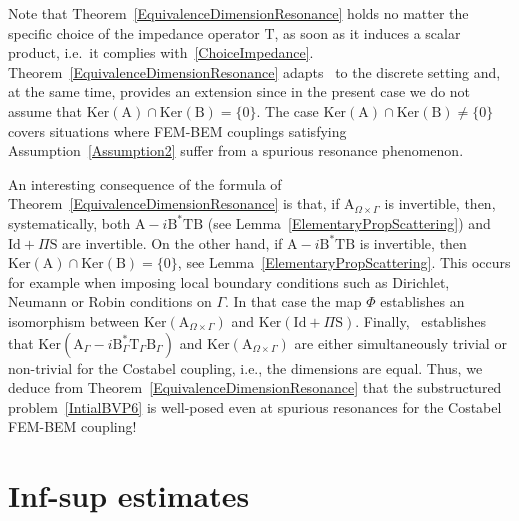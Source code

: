 \documentclass[a4paper,11pt]{article}
\newcommand{\mrm}{\mathrm}
\newcommand{\mA}{\mathrm{A}}
\newcommand{\mB}{\mathrm{B}}
\newcommand{\Id}{\mathrm{Id}}
\newcommand{\mT}{\mathrm{T}}
\newcommand{\mS}{\mathrm{S}}
\begin{document}
Note that Theorem~\ref{EquivalenceDimensionResonance} holds
no matter the specific choice of the impedance operator $\mT$, as soon as it induces a scalar
product, i.e.~it complies with~\eqref{ChoiceImpedance}. Theorem~\ref{EquivalenceDimensionResonance} adapts~\cite[Propositions 8.2 and 8.4]{MR4665035} to the discrete setting and, at
the same time, provides an extension since in the present case we do
not assume that $\mrm{Ker}(\mA)\cap \mrm{Ker}(\mB) = \{0\}$. The
case $\mrm{Ker}(\mA)\cap \mrm{Ker}(\mB)\neq \{0\}$ covers situations
where FEM-BEM couplings satisfying Assumption~\eqref{Assumption2} suffer from a spurious resonance phenomenon. 

An interesting consequence of the formula of Theorem~\ref{EquivalenceDimensionResonance} is that, if
$\mA_{\Omega\times\Gamma}$ is invertible, then, systematically, both
$\mA - i\mB^*\mT\mB$ (see Lemma~\ref{ElementaryPropScattering}) and
$\Id+\Pi\mS$ are invertible. On the other hand, if $\mA -
i\mB^*\mT\mB$ is invertible, then $\mrm{Ker}(\mA)\cap\mrm{Ker}(\mB)
= \{0\}$, see Lemma~\ref{ElementaryPropScattering}. This occurs for
example when imposing local boundary conditions such as Dirichlet,
Neumann or Robin conditions on $\Gamma$. In that case the map $\Phi$
establishes an isomorphism between
$\mrm{Ker}(\mA_{\Omega\times\Gamma})$ and
$\mrm{Ker}(\mrm{Id}+\Pi\mS)$.
Finally,~\cite{BoisneaultBonazzoliEtAl2025SRS} establishes that \(\mrm{Ker}(\mA_\Gamma -i\mB_\Gamma^*\mT_\Gamma\mB_\Gamma)\) and \(\mrm{Ker}(\mA_{\Omega\times\Gamma})\) are either simultaneously trivial or non-trivial for the Costabel coupling, i.e., the dimensions are equal. Thus, we deduce from Theorem~\ref{EquivalenceDimensionResonance} that the substructured problem~\eqref{IntialBVP6} is well-posed even at spurious resonances for the Costabel FEM-BEM coupling! 

\section{Inf-sup estimates}\label{sec:infsup_estimates}
\end{document}

